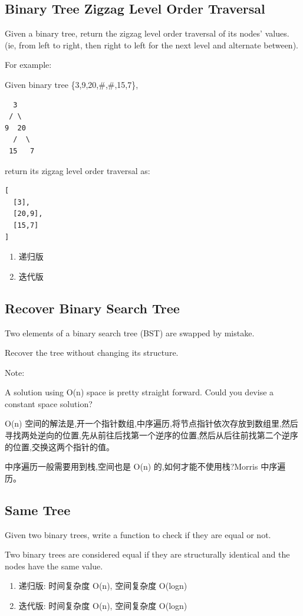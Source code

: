 \documentclass[12pt]{book}
\begin{document}
\subsection{Binary Tree Zigzag Level Order Traversal}
\label{sec-4-1-6}
Given a binary tree, return the zigzag level order traversal of its nodes' values. (ie, from left to right, then right to left for the next level and alternate between).

For example:

Given binary tree \{3,9,20,\#,\#,15,7\},
\lstset{language=java,label= ,caption= ,numbers=none}
\begin{lstlisting}
  3
 / \
9  20
  /  \
 15   7
\end{lstlisting}
return its zigzag level order traversal as:
\lstset{language=java,label= ,caption= ,numbers=none}
\begin{lstlisting}
[
  [3],
  [20,9],
  [15,7]
]
\end{lstlisting}
\begin{enumerate}
\item 递归版
\label{sec-4-1-6-1}
\item 迭代版
\label{sec-4-1-6-2}
\end{enumerate}

\subsection{Recover Binary Search Tree}
\label{sec-4-1-7}
Two elements of a binary search tree (BST) are swapped by mistake.

Recover the tree without changing its structure.

Note:

A solution using O(n) space is pretty straight forward. Could you devise a constant space solution?

O(n) 空间的解法是,开一个指针数组,中序遍历,将节点指针依次存放到数组里,然后寻找两处逆向的位置,先从前往后找第一个逆序的位置,然后从后往前找第二个逆序的位置,交换这两个指针的值。

中序遍历一般需要用到栈,空间也是 O(n) 的,如何才能不使用栈?Morris 中序遍历。

\subsection{Same Tree}
\label{sec-4-1-8}
Given two binary trees, write a function to check if they are equal or not.

Two binary trees are considered equal if they are structurally identical and the nodes have the same value.
\begin{enumerate}
\item 递归版: 时间复杂度 O(n), 空间复杂度 O(logn)
\label{sec-4-1-8-1}
\item 迭代版: 时间复杂度 O(n), 空间复杂度 O(logn)
\label{sec-4-1-8-2}
\end{enumerate}
\end{document}
